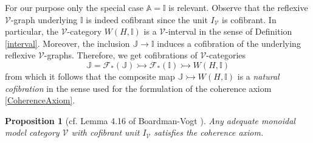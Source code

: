 \documentclass[10pt]{amsart}
\theoremstyle{plain}
\newtheorem{prp}[subsection]{Proposition}
\theoremstyle{remark}
\def\Vv{\mathcal{V}}
\def\Iso{\mathbb{I}}
\def\JJ{\mathbb{J}}
\def\ito{\rightarrowtail}
\def\AA{\mathbb{A}}
\def\Ff{\mathcal{F}}
\begin{document}
For our purpose only the special case $\AA=\Iso$ is relevant. Observe that the reflexive $\Vv$-graph underlying $\Iso$ is indeed cofibrant since the unit $I_\Vv$ is cofibrant. In particular, the $\Vv$-category $W(H,\Iso)$ is a $\Vv$-interval in the sense of Definition \ref{interval}. Moreover, the inclusion $\JJ\to\Iso$ induces a cofibration of the underlying reflexive $\Vv$-graphs. Therefore, we get cofibrations of $\Vv$-categories $$\JJ=\Ff_*(\JJ)\ito\Ff_*(\Iso)\ito W(H,\Iso)$$from which it follows that the composite map $\JJ\ito W(H,\Iso)$ is a \emph{natural cofibration} in the sense used for the formulation of the coherence axiom \ref{CoherenceAxiom}.

\begin{prp}[cf. Lemma 4.16 of Boardman-Vogt \cite{BV}]\label{Boardman-Vogt}Any adequate monoidal model category $\Vv$ with cofibrant unit $I_\Vv$ satisfies the coherence axiom.\end{prp}
\end{document}
